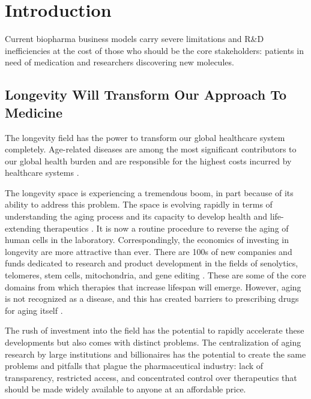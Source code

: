 \documentclass[12pt,letterpaper]{article}
\begin{document}
\newpage
\renewcommand{\contentsname}{\centering Table of Contents}

\tableofcontents

\newpage

\section{Introduction}
Current biopharma business models carry severe limitations and R\&D inefficiencies at the cost of those who should be the core stakeholders: patients in need of medication and researchers discovering new molecules.

\subsection{Longevity Will Transform Our Approach To Medicine}
The longevity field has the power to transform our global healthcare system completely. Age-related diseases are among the most significant contributors to our global health burden and are responsible for the highest costs incurred by healthcare systems \citep{WHO2011}. 

The longevity space is experiencing a tremendous boom, in part because of its ability to address this problem. The space is evolving rapidly in terms of understanding the aging process and its capacity to develop health and life-extending therapeutics \citep{ARDD2020}. It is now a routine procedure to reverse the aging of human cells in the laboratory. Correspondingly, the economics of investing in longevity are more attractive than ever. There are 100s of new companies and funds dedicated to research and product development in the fields of senolytics, telomeres, stem cells, mitochondria, and gene editing \citep{Pfleger2021}. These are some of the core domains from which therapies that increase lifespan will emerge. However, aging is not recognized as a disease, and this has created barriers to prescribing drugs for aging itself \citep{Suresh2014}. 

The rush of investment into the field has the potential to rapidly accelerate these developments but also comes with distinct problems. The centralization of aging research by large institutions and billionaires has the potential to create the same problems and pitfalls that plague the pharmaceutical industry: lack of transparency, restricted access, and concentrated control over therapeutics that should be made widely available to anyone at an affordable price. 
\end{document}
